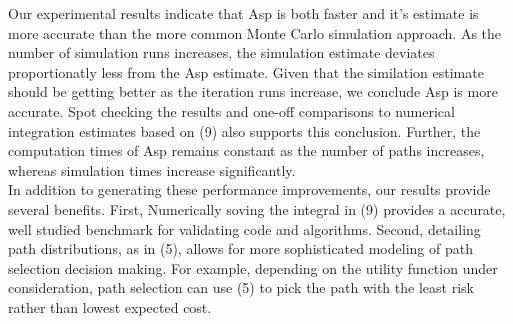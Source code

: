 \documentclass[twocolumn]{article}
\begin{document}
Our experimental results indicate that Asp is both faster and it's estimate is more accurate than the more common Monte Carlo simulation approach. As the number of simulation runs increases, the simulation estimate deviates proportionatly less from the Asp estimate. Given that the similation estimate should be getting better as the iteration runs increase, we conclude Asp is more accurate. Spot checking the results and one-off comparisons to numerical integration estimates based on (9) also supports this conclusion. Further, the computation times of Asp remains constant as the number of paths increases, whereas simulation times increase significantly. \\

In addition to generating these performance improvements, our results provide several benefits. First, Numerically soving the integral in (9) provides a accurate, well studied benchmark for validating code and algorithms. Second, detailing path distributions, as in (5), allows for more sophisticated modeling of path selection decision making. For example, depending on the utility function under consideration, path selection can use (5) to pick the path with the least risk rather than lowest expected cost.




\end{document}
